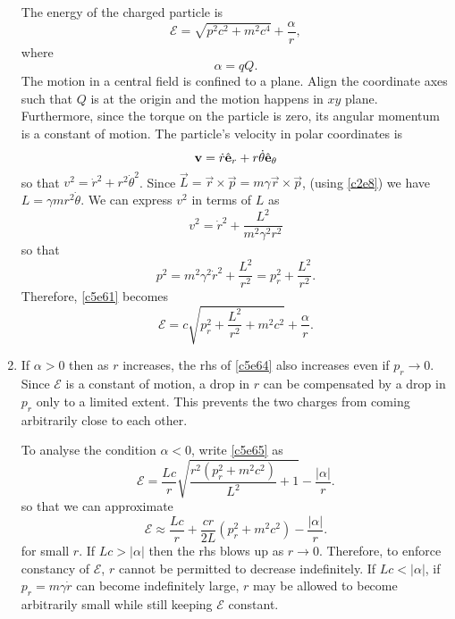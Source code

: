 \begin{enumerate}
The energy of the charged particle is
\begin{equation}\label{c5e61}
\mathcal{E} = \sqrt{p^2c^2 + m^2c^4} + \frac{\alpha}{r},
\end{equation}
where
\begin{equation}\label{c5e62}
\alpha = qQ.
\end{equation}
The motion in a central field is confined to a plane. Align the coordinate axes
such that $Q$ is at the origin and the motion happens in $xy$ plane. Furthermore,
since the torque on the particle is zero, its angular momentum is a constant of
motion. The particle's velocity in polar coordinates is
\begin{equation}\label{c5e63}
\mathbf{v} = \dot{r}\hat{\mathbf{e}}_{r} + r\dot{\theta}\hat{\mathbf{e}}_{\theta}
\end{equation}
so that $v^2 = \dot{r}^2 + r^2\dot{\theta}^2$. Since $\vec{L} = \vec{r} \times
\vec{p} = m\gamma\vec{r} \times \vec{p}$, (using \eqref{c2e8}) we have $L = 
\gamma mr^2\dot{\theta}$. We can express $v^2$ in terms of $L$ as
\[
v^2 = \dot{r}^2 + \frac{L^2}{m^2\gamma^2 r^2}
\]
so that
\begin{equation}\label{c5e64}
p^2 = m^2\gamma^2\dot{r}^2 + \frac{L^2}{r^2} = p_r^2 + \frac{L^2}{r^2}.
\end{equation}
Therefore, \eqref{c5e61} becomes
\begin{equation}\label{c5e65}
\mathcal{E} = c\sqrt{p_r^2 + \frac{L^2}{r^2} + m^2c^2} + \frac{\alpha}{r}.
\end{equation}

\item If $\alpha > 0$ then as $r$ increases, the rhs of \eqref{c5e64} also
increases even if $p_r \rightarrow 0$. Since $\mathcal{E}$ is a constant of
motion, a drop in $r$ can be compensated by a drop in $p_r$ only to a limited
extent. This prevents the two charges from coming arbitrarily close to each 
other.

To analyse the condition $\alpha < 0$, write \eqref{c5e65} as
\[
\mathcal{E} = \frac{Lc}{r}\sqrt{\frac{r^2(p_r^2 + m^2c^2)}{L^2} + 1} - \frac{|\alpha|}{r}.
\]
so that we can approximate
\[
\mathcal{E} \approx \frac{Lc}{r} + \frac{cr}{2L}(p_r^2 + m^2c^2) - \frac{|\alpha|}{r}.
\]
for small $r$. If $Lc > |\alpha|$ then the rhs blows up as $r \rightarrow 0$. 
Therefore, to enforce constancy of $\mathcal{E}$, $r$ cannot be permitted to
decrease indefinitely. If $Lc < |\alpha|$, if $p_r = m\gamma\dot{r}$ can become
indefinitely large, $r$ may be allowed to become arbitrarily small while still
keeping $\mathcal{E}$ constant.


\end{enumerate}
